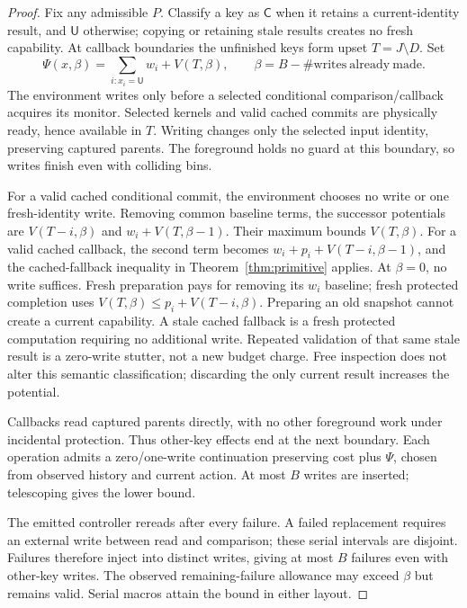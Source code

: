 \documentclass[acmsmall,screen,review,anonymous]{acmart}
\newcommand{\U}{\mathsf U}
\newcommand{\C}{\mathsf C}
\begin{document}
\begin{proof}
Fix any admissible $P$. Classify a key as $\C$ when it retains a current-identity result, and $\U$ otherwise; copying or retaining stale results creates no fresh capability. At callback boundaries the unfinished keys form upset $T=J\setminus D$. Set
\[
 \Psi(x,\beta)=\sum_{i:x_i=\U}w_i+V(T,\beta),
 \qquad\beta=B-\#\mathrm{writes\ already\ made}.
\]
The environment writes only before a selected conditional comparison/callback acquires its monitor. Selected kernels and valid cached commits are physically ready, hence available in $T$. Writing changes only the selected input identity, preserving captured parents. The foreground holds no guard at this boundary, so writes finish even with colliding bins.

For a valid cached conditional commit, the environment chooses no write or one fresh-identity write. Removing common baseline terms, the successor potentials are $V(T-i,\beta)$ and $w_i+V(T,\beta-1)$. Their maximum bounds $V(T,\beta)$. For a valid cached callback, the second term becomes $w_i+p_i+V(T-i,\beta-1)$, and the cached-fallback inequality in Theorem~\ref{thm:primitive} applies. At $\beta=0$, no write suffices. Fresh preparation pays for removing its $w_i$ baseline; fresh protected completion uses $V(T,\beta)\le p_i+V(T-i,\beta)$. Preparing an old snapshot cannot create a current capability. A stale cached fallback is a fresh protected computation requiring no additional write. Repeated validation of that same stale result is a zero-write stutter, not a new budget charge. Free inspection does not alter this semantic classification; discarding the only current result increases the potential.

Callbacks read captured parents directly, with no other foreground work under incidental protection. Thus other-key effects end at the next boundary. Each operation admits a zero/one-write continuation preserving cost plus $\Psi$, chosen from observed history and current action. At most $B$ writes are inserted; telescoping gives the lower bound.

The emitted controller rereads after every failure. A failed replacement requires an external write between read and comparison; these serial intervals are disjoint. Failures therefore inject into distinct writes, giving at most $B$ failures even with other-key writes. The observed remaining-failure allowance may exceed $\beta$ but remains valid. Serial macros attain the bound in either layout.
\end{proof}
\end{document}
